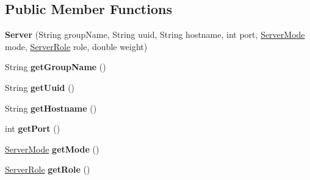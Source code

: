 \subsection*{Public Member Functions}
\begin{DoxyCompactItemize}
\item 
\mbox{\label{classcom_1_1mysql_1_1fabric_1_1_server_a1941000ec3a92da600c03cab2caaa9b2}} 
{\bfseries Server} (String group\+Name, String uuid, String hostname, int port, \mbox{\hyperlink{enumcom_1_1mysql_1_1fabric_1_1_server_mode}{Server\+Mode}} mode, \mbox{\hyperlink{enumcom_1_1mysql_1_1fabric_1_1_server_role}{Server\+Role}} role, double weight)
\item 
\mbox{\label{classcom_1_1mysql_1_1fabric_1_1_server_a1a35c4556703040e79514b2eea6c9765}} 
String {\bfseries get\+Group\+Name} ()
\item 
\mbox{\label{classcom_1_1mysql_1_1fabric_1_1_server_a5b79f81507c5b4223705dd27f9eb34fd}} 
String {\bfseries get\+Uuid} ()
\item 
\mbox{\label{classcom_1_1mysql_1_1fabric_1_1_server_a08000a227723b69154fdb9b1f4eae650}} 
String {\bfseries get\+Hostname} ()
\item 
\mbox{\label{classcom_1_1mysql_1_1fabric_1_1_server_aa506464c5769b71dd3b44f177f72254c}} 
int {\bfseries get\+Port} ()
\item 
\mbox{\label{classcom_1_1mysql_1_1fabric_1_1_server_aa48900183173403e58edeabdde38077f}} 
\mbox{\hyperlink{enumcom_1_1mysql_1_1fabric_1_1_server_mode}{Server\+Mode}} {\bfseries get\+Mode} ()
\item 
\mbox{\label{classcom_1_1mysql_1_1fabric_1_1_server_ac997e79dceb6e832d0cdaf85b1a069f8}} 
\mbox{\hyperlink{enumcom_1_1mysql_1_1fabric_1_1_server_role}{Server\+Role}} {\bfseries get\+Role} ()
\item 
\mbox{\label{classcom_1_1mysql_1_1fabric_1_1_server_ae7b46a0cbeb8ee25e542aeb8fc2b62fc}} 

\end{DoxyCompactItemize}
